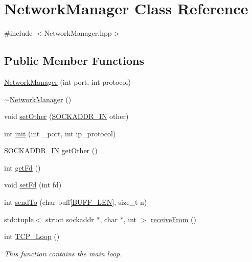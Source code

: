 \hypertarget{classNetworkManager}{}\section{Network\+Manager Class Reference}
\label{classNetworkManager}


{\ttfamily \#include $<$Network\+Manager.\+hpp$>$}

\subsection*{Public Member Functions}
\begin{DoxyCompactItemize}
\item 
\mbox{\hyperlink{classNetworkManager_a326a7681ace2029fa6a606def54c066e}{Network\+Manager}} (int port, int protocol)
\item 
\mbox{\hyperlink{classNetworkManager_a2cfe4223139cf58587a9f066b956cb23}{$\sim$\+Network\+Manager}} ()
\item 
void \mbox{\hyperlink{classNetworkManager_aff763a02730b218f72f51a96a02f0dda}{set\+Other}} (\mbox{\hyperlink{NetworkManager_8hpp_a6a34800fb5689e853f978b485a41aa39}{S\+O\+C\+K\+A\+D\+D\+R\+\_\+\+IN}} other)
\item 
int \mbox{\hyperlink{classNetworkManager_a4ac57f20b56fc1a2898eb9a1f5c7900b}{init}} (int \+\_\+port, int ip\+\_\+protocol)
\item 
\mbox{\hyperlink{NetworkManager_8hpp_a6a34800fb5689e853f978b485a41aa39}{S\+O\+C\+K\+A\+D\+D\+R\+\_\+\+IN}} \mbox{\hyperlink{classNetworkManager_add2dcea7f26b8ff8ac6a5c49d4c956eb}{get\+Other}} ()
\item 
int \mbox{\hyperlink{classNetworkManager_ae437a06c3cfa8c7c2df9f7e98f0395bf}{get\+Fd}} ()
\item 
void \mbox{\hyperlink{classNetworkManager_a2d7ffe30427c533766b05ca568ffb125}{set\+Fd}} (int fd)
\item 
int \mbox{\hyperlink{classNetworkManager_a8c7c31a6fdbc5ed52f8d3bddf16a84e6}{send\+To}} (char buff\mbox{[}\mbox{\hyperlink{NetworkManager_8hpp_a6ac7d11a56af31a55035980e2fed464a}{B\+U\+F\+F\+\_\+\+L\+EN}}\mbox{]}, size\+\_\+t n)
\item 
std\+::tuple$<$ struct sockaddr $\ast$, char $\ast$, int $>$ \mbox{\hyperlink{classNetworkManager_a07057dcbe4af4740383384daf8289d5f}{receive\+From}} ()
\item 
int \mbox{\hyperlink{classNetworkManager_a1979812356b715646302bf188f74aff5}{T\+C\+P\+\_\+\+Loop}} ()
\begin{DoxyCompactList}\small\item\em This function contains the main loop.~\newline

\end{DoxyCompactList}
\end{DoxyCompactItemize}
